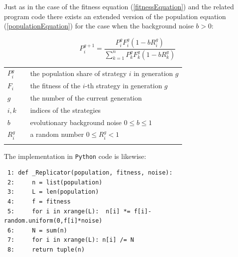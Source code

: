 Just as in the case of the fitness equation (\ref{fitnessEquation}) and the
related program code there exists an extended version of the population
equation (\ref{populationEquation}) for the case when the background noise $b
> 0$: 

\begin{equation}
\label{extendedPopulationEquation}
P_i^{g+1} = \frac{P_i^gF_i^g(1-bR_i^g)}{\sum_{k=1}^n P_k^gF_k^g(1-bR_k^g)}
\end{equation}
\begin{tabular}{lll}
$P_i^g$ & & the population share of strategy $i$ in generation $g$ \\
$F_i$ & & the fitness of the $i$-th strategy in generation $g$ \\
$g$ & & the number of the current generation \\
$i,k$ & & indices of the strategies \\
$b$ & & evolutionary background noise $ 0 \le b \le 1$ \\
$R_i^g$ & & a random number $0 \le R_i^g < 1$ \\
& & \\
\end{tabular} 

The implementation in {\tt Python} code is likewise:

\begin{scriptsize}
\begin{verbatim}
 1: def _Replicator(population, fitness, noise):
 2:     n = list(population)
 3:     L = len(population)
 4:     f = fitness
 5:     for i in xrange(L):  n[i] *= f[i]- random.uniform(0,f[i]*noise)
 6:     N = sum(n)
 7:     for i in xrange(L): n[i] /= N
 8:     return tuple(n)
\end{verbatim}
\end{scriptsize}

